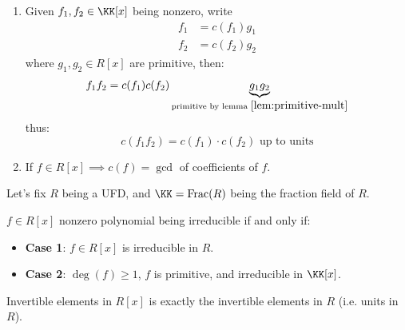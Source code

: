 \begin{remark}
	\leavevmode
	\begin{enumerate}
		\item Given \( f_1, f_2 \in \KK[x] \) being nonzero, write
		      \[
			      \begin{aligned}
				      f_1 & = c(f_1) g_1 \\
				      f_2 & = c(f_2) g_2
			      \end{aligned}
		      \]
		      where \( g_1,g_2 \in R[x] \) are primitive, then:
		      \[
			      f_1 f_2 = c(f_1)c(f_2) \underbrace{g_1 g_2}_{\text{primitive by lemma }
			      \ref{lem:primitive-mult}}
		      \]
		      thus:
		      \[
			      c(f_1f_2) = c(f_1) \cdot c(f_2) \text{ up to units}
		      \]
		\item If \( f \in R[x] \implies c(f) = \gcd \) of coefficients of \( f \).
	\end{enumerate}
\end{remark}
Let's fix \( R \) being a UFD, and \( \KK = \text{Frac}(R) \) being the fraction field of \( R \).

\begin{proposition}
	\label{prop:irred-criterion}
	\( f \in R[x] \) nonzero polynomial being irreducible if and only if:
	\begin{itemize}
		\item \textbf{Case 1}: \( f \in R[x] \) is irreducible in \( R \).
		\item \textbf{Case 2}: \( \deg(f) \geq 1 \), \( f \) is primitive, and irreducible in \( \KK[x] \).
	\end{itemize}
\end{proposition}

\begin{note}
	Invertible elements in \( R[x] \) is exactly the invertible elements in \( R \) (i.e. units in \(
	R \)).
\end{note}

